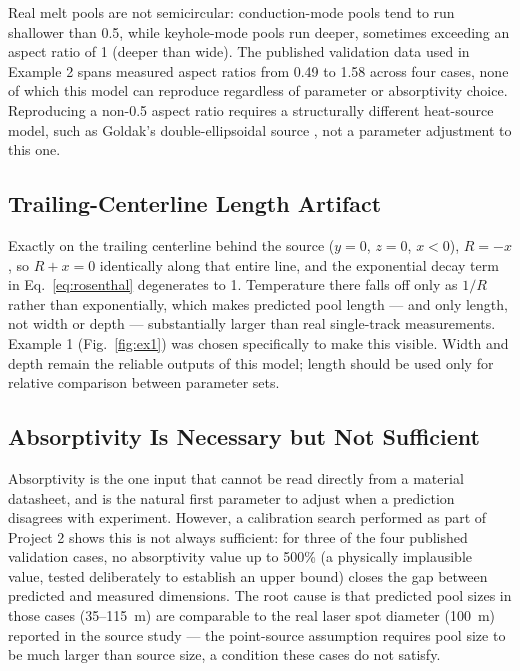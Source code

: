 \documentclass[10pt,journal]{IEEEtran}
\begin{document}
Real melt pools are not semicircular: conduction-mode pools tend to run shallower than 0.5, while keyhole-mode pools run deeper, sometimes exceeding an aspect ratio of 1 (deeper than wide). The published validation data used in Example 2 spans measured aspect ratios from 0.49 to 1.58 across four cases, none of which this model can reproduce regardless of parameter or absorptivity choice. Reproducing a non-0.5 aspect ratio requires a structurally different heat-source model, such as Goldak's double-ellipsoidal source \cite{goldak1984}, not a parameter adjustment to this one.

\subsection{Trailing-Centerline Length Artifact}

Exactly on the trailing centerline behind the source ($y=0$, $z=0$, $x<0$), $R=-x$, so $R+x=0$ identically along that entire line, and the exponential decay term in Eq.~\ref{eq:rosenthal} degenerates to 1. Temperature there falls off only as $1/R$ rather than exponentially, which makes predicted pool length --- and only length, not width or depth --- substantially larger than real single-track measurements. Example 1 (Fig.~\ref{fig:ex1}) was chosen specifically to make this visible. Width and depth remain the reliable outputs of this model; length should be used only for relative comparison between parameter sets.

\subsection{Absorptivity Is Necessary but Not Sufficient}

Absorptivity is the one input that cannot be read directly from a material datasheet, and is the natural first parameter to adjust when a prediction disagrees with experiment. However, a calibration search performed as part of Project 2 shows this is not always sufficient: for three of the four published validation cases, no absorptivity value up to 500\% (a physically implausible value, tested deliberately to establish an upper bound) closes the gap between predicted and measured dimensions. The root cause is that predicted pool sizes in those cases (35--115~\textmu m) are comparable to the real laser spot diameter (100~\textmu m) reported in the source study --- the point-source assumption requires pool size to be much larger than source size, a condition these cases do not satisfy.
\end{document}
